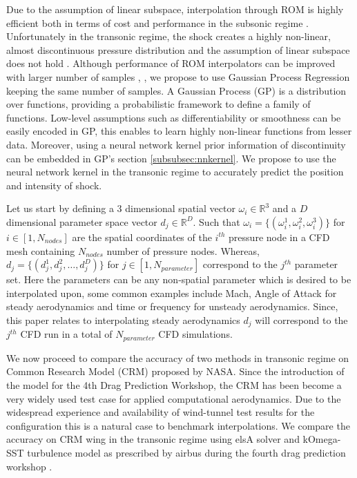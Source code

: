 Due to the assumption of linear subspace, interpolation through ROM is highly efficient both in terms of cost and performance in the subsonic regime \cite{verveld2016reduced}. Unfortunately in the transonic regime, the shock creates a highly non-linear, almost discontinuous pressure distribution and the assumption of linear subspace does not hold \cite{li2016performance}. Although performance of ROM interpolators can be improved with larger number of samples \cite{franz2014interpolation}, \cite{forrester2008engineering}, we propose to use Gaussian Process Regression \cite{rasmussen2006gaussian} keeping the same number of samples. A Gaussian Process (GP) is a distribution over functions, providing a probabilistic framework to define a family of functions. Low-level assumptions such as differentiability or smoothness can be easily encoded in GP, this enables to learn highly non-linear functions from lesser data. Moreover, using a neural network kernel \cite{neal2012bayesian} prior information of discontinuity can be embedded in GP's section \ref{subsubsec:nnkernel}. We propose to use the neural network kernel in the transonic regime to accurately predict the position and intensity of shock. 

Let us start by defining a \(3\) dimensional spatial vector \(\omega_{i} \in  \mathbb{R}^{3}\) and a \(D\) dimensional parameter space vector \(d_{j} \in  \mathbb{R}^{D}\). Such that \(\omega_{i} = \{(\omega_{i}^{1}, \omega_{i}^{2}, \omega_{i}^{3})\}\) for \(i \in [1,N_{nodes}] \) are the spatial coordinates of the \(i^{th}\) pressure node in a CFD mesh containing \(N_{nodes}\) number of pressure nodes. Whereas, \(d_{j} = \{(d_{j}^{1}, d_{j}^{2}, \ldots ,d_{j}^{D})\}\) for  \(j \in [1,N_{parameter}] \) correspond to the \(j^{th}\) parameter set. Here the parameters can be any non-spatial parameter which is desired to be interpolated upon, some common examples include Mach, Angle of Attack for steady aerodynamics and time or frequency for unsteady aerodynamics. Since, this paper relates to interpolating steady aerodynamics \(d_{j}\) will correspond to the \(j^{th}\) CFD run in a total of \(N_{parameter}\) CFD simulations.

We now proceed to compare the accuracy of two methods in transonic regime on Common Research Model (CRM)  proposed by NASA. Since the introduction of the model for the 4th Drag Prediction Workshop, the CRM has been become a very widely used test case for applied computational aerodynamics. Due to the widespread experience and availability of wind-tunnel test results for the configuration this is a natural case to benchmark interpolations. We compare the accuracy on CRM wing in the transonic regime using elsA solver and kOmega-SST turbulence model as prescribed by airbus during the fourth drag prediction workshop \cite{vassberg2014summary}. 

